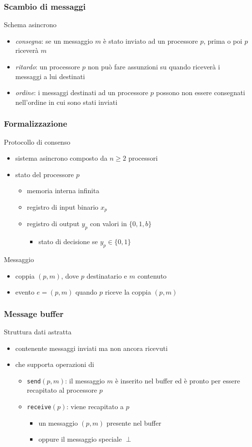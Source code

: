 \documentclass{beamer}
\begin{document}
\begin{frame}\frametitle{Scambio di messaggi}
Schema asincrono
\begin{itemize}
\item\emph{consegna}: se un messaggio $m$ è stato inviato ad un processore
  $p$, prima o poi $p$ riceverà $m$
\item\emph{ritardo}: un processore $p$ non può fare assunzioni su quando riceverà i messaggi a lui destinati
\item\emph{ordine}: i messaggi destinati ad un processore $p$ possono non
  essere consegnati nell'ordine in cui sono stati inviati
\end{itemize}
\end{frame}


\begin{frame}\frametitle{Formalizzazione}
Protocollo di consenso
\begin{itemize}
\item sistema asincrono composto da $n\geq 2$ processori
\item stato del processore $p$
\begin{itemize}
\item memoria interna infinita
\item registro di input binario $x_p$
\item registro di output $y_p$ con valori in $\{0,1,b\}$
\begin{itemize}\item stato di decisione se $y_p\in\{0,1\}$\end{itemize}
\end{itemize}
\end{itemize}

Messaggio
\begin{itemize}
\item coppia $(p,m)$, dove $p$ destinatario e $m$ contenuto
\item evento $e=(p,m)$ quando $p$ riceve la coppia $(p,m)$
\end{itemize}
\end{frame}




\begin{frame}\frametitle{Message buffer}
Struttura dati astratta
\begin{itemize}
\item contenente messaggi inviati ma non ancora ricevuti
\item che supporta operazioni di 
\begin{itemize}
\item\texttt{send$(p,m)$}: il messaggio $m$ è inserito nel buffer ed è pronto per essere recapitato al processore $p$
\item\texttt{receive$(p)$}: viene recapitato a $p$
\begin{itemize}
\item un messaggio $(p,m)$ presente nel buffer
\item oppure il messaggio speciale $\perp$
\end{itemize}
\end{itemize}
\end{itemize}
\end{frame}
\end{document}
